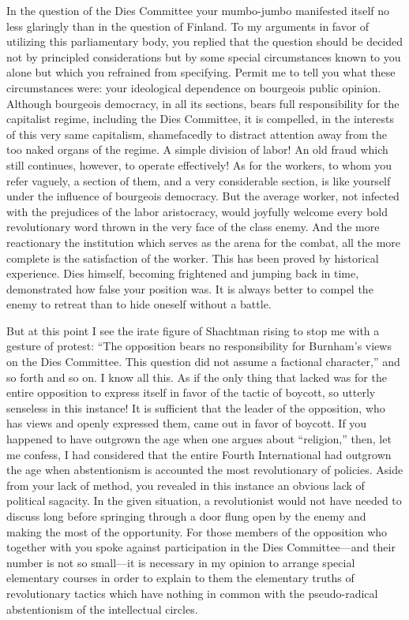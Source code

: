 In the question of the Dies Committee your mumbo-jumbo manifested itself no less glaringly than in the question of Finland. To my arguments in favor of utilizing this parliamentary body, you replied that the question should be decided not by principled considerations but by some special circumstances known to you alone but which you refrained from specifying. Permit me to tell you what these circumstances were: your ideological dependence on bourgeois public opinion. Although bourgeois democracy, in all its sections, bears full responsibility for the capitalist regime, including the Dies Committee, it is compelled, in the interests of this very same capitalism, shamefacedly to distract attention away from the too naked organs of the regime. A simple division of labor! An old fraud which still continues, however, to operate effectively! As for the workers, to whom you refer vaguely, a section of them, and a very considerable section, is like yourself under the influence of bourgeois democracy. But the average worker, not infected with the prejudices of the labor aristocracy, would joyfully welcome every bold revolutionary word thrown in the very face of the class enemy. And the more reactionary the institution which serves as the arena for the combat, all the more complete is the satisfaction of the worker. This has been proved by historical experience. Dies himself, becoming frightened and jumping back in time, demonstrated how false your position was. It is always better to compel the enemy to retreat than to hide oneself without a battle.

But at this point I see the irate figure of Shachtman rising to stop me with a gesture of protest: “The opposition bears no responsibility for Burnham’s views on the Dies Committee. This question did not assume a factional character,” and so forth and so on. I know all this. As if the only thing that lacked was for the entire opposition to express itself in favor of the tactic of boycott, so utterly senseless in this instance! It is sufficient that the leader of the opposition, who has views and openly expressed them, came out in favor of boycott. If you happened to have outgrown the age when one argues about “religion,” then, let me confess, I had considered that the entire Fourth International had outgrown the age when abstentionism is accounted the most revolutionary of policies. Aside from your lack of method, you revealed in this instance an obvious lack of political sagacity. In the given situation, a revolutionist would not have needed to discuss long before springing through a door flung open by the enemy and making the most of the opportunity. For those members of the opposition who together with you spoke against participation in the Dies Committee---and their number is not so small---it is necessary in my opinion to arrange special elementary courses in order to explain to them the elementary truths of revolutionary tactics which have nothing in common with the pseudo-radical abstentionism of the intellectual circles.

